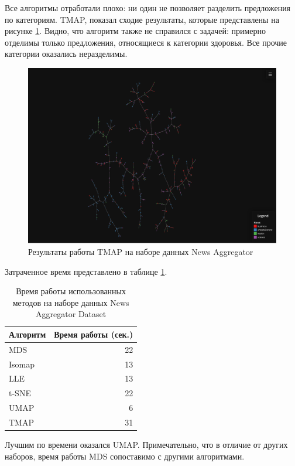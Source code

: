 \documentclass[10pt, a4paper]{extarticle}
\begin{document}
Все алгоритмы отработали плохо: ни один не позволяет разделить предложения по категориям. TMAP, показал сходие результаты, которые представлены на рисунке \ref{fig:tmap_news}. Видно, что алгоритм также не справился с задачей: примерно отделимы только предложения, относящиеся к категории здоровья. Все прочие категории оказались неразделимы. 
\begin{figure}[h!]
    \vspace{1em}
    \centering
    \includegraphics[width=\linewidth]{news_tmap.pdf}
    \caption{Результаты работы TMAP на наборе данных News Aggregator}
    \label{fig:tmap_news}
\end{figure}
Затраченное время представлено в таблице \ref{tab:news_time}.
\begin{table}[h!]
    \centering
    \begin{tabular}{l r}
        \toprule
         Алгоритм & Время работы (сек.)  \\
         \midrule
         MDS & 22 \\
         Isomap & 13 \\
         LLE & 13 \\
         t-SNE & 22 \\
         UMAP & 6 \\
         TMAP & 31 \\
         \bottomrule
    \end{tabular}
    \caption{Время работы использованных методов на наборе данных News Aggregator Dataset}
    \label{tab:news_time}
\end{table}
Лучшим по времени оказался UMAP. Примечательно, что в отличие от других наборов, время работы MDS сопоставимо с другими алгоритмами.
\end{document}
